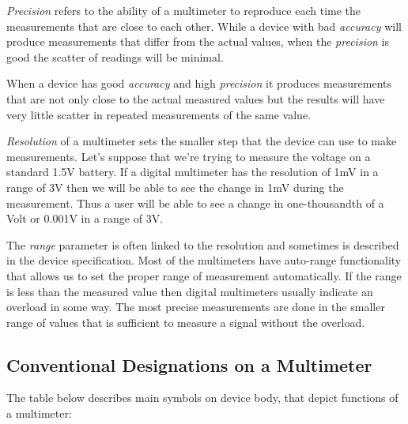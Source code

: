 \documentclass[../main.tex]{subfiles}
\begin{document}
\emph{Precision} refers to the ability of a multimeter to reproduce each time
the measurements that are close to each other.  While a device with bad
\emph{accuracy} will produce measurements that differ from the actual values,
when the \emph{precision} is good the scatter of readings will be minimal.

When a device has good \emph{accuracy} and high \emph{precision} it produces
measurements that are not only close to the actual measured values but the
results will have very little scatter in repeated measurements of the same
value.

\emph{Resolution} of a multimeter sets the smaller step that the device can use
to make measurements.  Let's suppose that we're trying to measure the voltage on
a standard 1.5V battery.  If a digital multimeter has the resolution of 1mV in a
range of 3V then we will be able to see the change in 1mV during the
measurement.  Thus a user will be able to see a change in one-thousandth of a
Volt or 0.001V in a range of 3V.

The \emph{range} parameter is often linked to the resolution and sometimes is
described in the device specification.  Most of the multimeters have auto-range
functionality that allows us to set the proper range of measurement
automatically.  If the range is less than the measured value then digital
multimeters usually indicate an overload in some way.  The most precise
measurements are done in the smaller range of values that is sufficient to
measure a signal without the overload.

\subsection{Conventional Designations on a Multimeter}

The table below describes main symbols on device body, that depict functions of
a multimeter:
\end{document}
